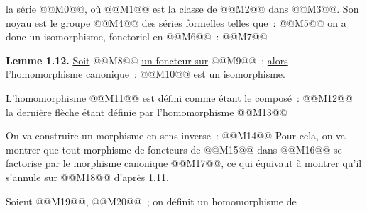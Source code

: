 
la série @@M0@@, où @@M1@@ est la classe de @@M2@@ dans @@M3@@. Son
noyau est le groupe @@M4@@ des séries formelles telles que~:
@@M5@@
on a donc un isomorphisme, fonctoriel en @@M6@@~:
@@M7@@

\textbf{Lemme 1.12.} \uline{Soit} @@M8@@ \uline{un foncteur sur} @@M9@@~; \uline{alors l'homomorphisme canonique}~:
@@M10@@
\uline{est un isomorphisme}.

L'homomorphisme @@M11@@ est défini comme étant le composé~:
@@M12@@
la dernière flèche étant définie par l'homomorphisme @@M13@@

On va construire un morphisme en sens inverse~:
@@M14@@
Pour cela, on va montrer que tout morphisme de foncteurs de @@M15@@ dans @@M16@@ se factorise par le morphisme canonique @@M17@@, ce qui équivaut à montrer qu'il s'annule sur @@M18@@ d'après 1.11.

Soient @@M19@@, @@M20@@~; on définit un homomorphisme de
